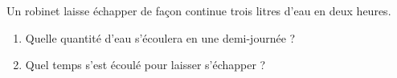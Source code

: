 \begin{exercice*}
   Un robinet laisse échapper de façon continue trois litres d’eau en deux heures.
   \begin{enumerate}
      \item Quelle quantité d’eau s'écoulera en une demi-journée ?
      \item Quel temps s’est écoulé pour laisser s’échapper  ?
   \end{enumerate}
\end{exercice*}
